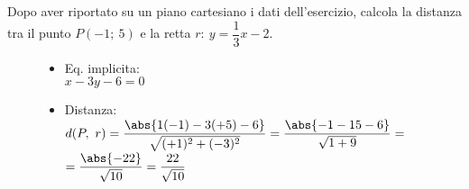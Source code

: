  \begin{esempio}
  Dopo aver riportato su un piano cartesiano i dati dell'esercizio,
  calcola la distanza tra il punto \(P(-1;~5)\) e
  la retta \(r:~y = \dfrac{1}{3} x -2\). 

\begin{inaccessibleblock}
 \begin{figure}[h]
 \centering
\hspace{-5mm}
\begin{minipage}[]{.62\textwidth}
\begin{itemize}
  \item Eq. implicita:\\
  \(x -3y -6 = 0\)\\
  \item Distanza: \\
  \(d(P,~r) = \dfrac{\abs{1(-1) -3(+5) -6}}{\sqrt{(+1)^2 + (-3)^2}}=
  \dfrac{\abs{-1 -15 -6}}{\sqrt{1 + 9}}=\)\\[.5em]
  \(= \dfrac{\abs{-22}}{\sqrt{10}}=\dfrac{22}{\sqrt{10}}\)
  \end{itemize}
 \end{minipage}
 \begin{minipage}[]{.40\textwidth}
   \begin{center} \distpuntoretta \end{center}
 \end{minipage}
\label{fig:distpuntoretta}
\end{figure}
\end{inaccessibleblock}
 \end{esempio}
 
